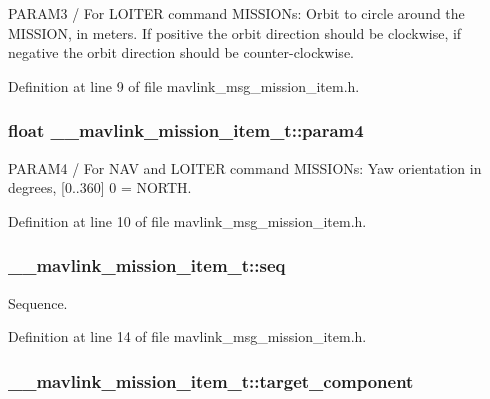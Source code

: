 P\-A\-R\-A\-M3 / For L\-O\-I\-T\-E\-R command M\-I\-S\-S\-I\-O\-Ns\-: Orbit to circle around the M\-I\-S\-S\-I\-O\-N, in meters. If positive the orbit direction should be clockwise, if negative the orbit direction should be counter-\/clockwise. 



Definition at line 9 of file mavlink\-\_\-msg\-\_\-mission\-\_\-item.\-h.

\hypertarget{struct____mavlink__mission__item__t_a8db8965269e5523972f4645f9b52d86d}{
\subsubsection[{param4}]{\setlength{\rightskip}{0pt plus 5cm}float \-\_\-\-\_\-mavlink\-\_\-mission\-\_\-item\-\_\-t\-::param4}}\label{struct____mavlink__mission__item__t_a8db8965269e5523972f4645f9b52d86d}


P\-A\-R\-A\-M4 / For N\-A\-V and L\-O\-I\-T\-E\-R command M\-I\-S\-S\-I\-O\-Ns\-: Yaw orientation in degrees, \mbox{[}0..360\mbox{]} 0 = N\-O\-R\-T\-H. 



Definition at line 10 of file mavlink\-\_\-msg\-\_\-mission\-\_\-item.\-h.

\hypertarget{struct____mavlink__mission__item__t_a0038a8dc2e0dc3757272b160a0cbaac2}{
\subsubsection[{seq}]{ \-\_\-\-\_\-mavlink\-\_\-mission\-\_\-item\-\_\-t\-::seq}}\label{struct____mavlink__mission__item__t_a0038a8dc2e0dc3757272b160a0cbaac2}


Sequence. 



Definition at line 14 of file mavlink\-\_\-msg\-\_\-mission\-\_\-item.\-h.

\hypertarget{struct____mavlink__mission__item__t_a6bb8183ef3416741edca46337e6e6860}{
\subsubsection[{target\-\_\-component}]{ \-\_\-\-\_\-mavlink\-\_\-mission\-\_\-item\-\_\-t\-::target\-\_\-component}}\label{struct____mavlink__mission__item__t_a6bb8183ef3416741edca46337e6e6860}


